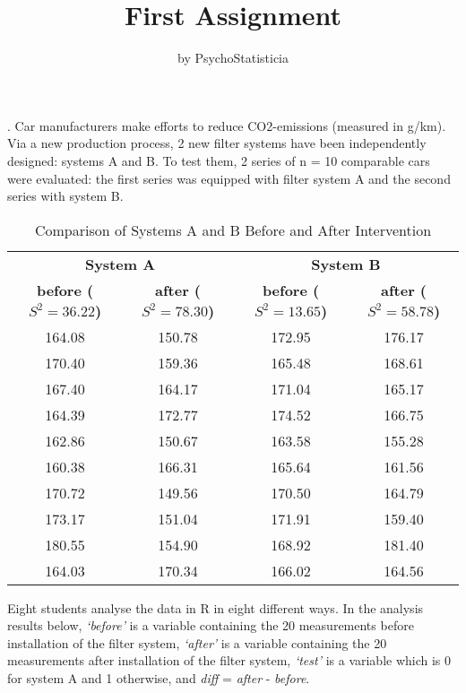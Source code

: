 \documentclass[12pt,a4paper]{article}
\title{\textbf{First Assignment}}
\author{by PsychoStatisticia}
\date{}
\begin{document}
	\maketitle
	
	. Car manufacturers make efforts to reduce CO2-emissions (measured in g/km). Via a new production process, 2 new filter systems have been independently designed: systems A and B. To test them, 2 series of n = 10 comparable cars were evaluated: the first series was equipped with filter system A and the second series with system B.
	
	\begin{table}[htbp]
		\centering
		\caption{Comparison of Systems A and B Before and After Intervention}
		\begin{tabular}{cccc}
			\toprule
			\multicolumn{2}{c}{\textbf{System A}} &
			\multicolumn{2}{c}{\textbf{System B}}\\
			\textbf{before ($S^2=36.22$)} & 
			\textbf{after ($S^2=78.30$)} &
			\textbf{before ($S^2=13.65$)} &
			\textbf{after ($S^2=58.78$)}\\
			\midrule
			164.08 & 150.78 & 172.95 & 176.17 \\
			170.40 & 159.36 & 165.48 & 168.61 \\
			167.40 & 164.17 & 171.04 & 165.17 \\
			164.39 & 172.77 & 174.52 & 166.75 \\
			162.86 & 150.67 & 163.58 & 155.28 \\
			160.38 & 166.31 & 165.64 & 161.56 \\
			170.72 & 149.56 & 170.50 & 164.79 \\
			173.17 & 151.04 & 171.91 & 159.40 \\
			180.55 & 154.90 & 168.92 & 181.40 \\
			164.03 & 170.34 & 166.02 & 164.56 \\
			\bottomrule
		\end{tabular}
	\end{table}
	
	\noindent Eight students analyse the data in R in eight different ways. In the analysis results below, \textit{‘before’} is a variable containing the 20 measurements before installation of the filter system, \textit{‘after’} is a variable containing the 20 measurements after installation of the filter system, \textit{‘test’} is a variable which is 0 for system A and 1 otherwise, and \textit{diff} = \textit{after} - \textit{before}.
	
\end{document}
